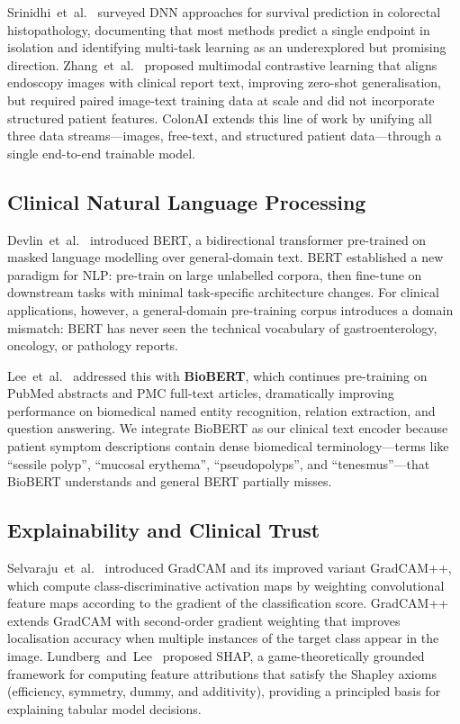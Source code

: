 \documentclass[conference]{IEEEtran}
\begin{document}
Srinidhi~et~al.~\cite{srinidhi2021} surveyed DNN approaches for survival
prediction in colorectal histopathology, documenting that most methods predict
a single endpoint in isolation and identifying multi-task learning as an
underexplored but promising direction. Zhang~et~al.~\cite{zhang2022} proposed
multimodal contrastive learning that aligns endoscopy images with clinical
report text, improving zero-shot generalisation, but required paired image-text
training data at scale and did not incorporate structured patient features.
ColonAI extends this line of work by unifying all three data streams---images,
free-text, and structured patient data---through a single end-to-end trainable
model.

\subsection{Clinical Natural Language Processing}

Devlin~et~al.~\cite{devlin2019} introduced BERT, a bidirectional transformer
pre-trained on masked language modelling over general-domain text. BERT
established a new paradigm for NLP: pre-train on large unlabelled corpora,
then fine-tune on downstream tasks with minimal task-specific architecture
changes. For clinical applications, however, a general-domain pre-training
corpus introduces a domain mismatch: BERT has never seen the technical
vocabulary of gastroenterology, oncology, or pathology reports.

Lee~et~al.~\cite{lee2020biobert} addressed this with \textbf{BioBERT},
which continues pre-training on PubMed abstracts and PMC full-text articles,
dramatically improving performance on biomedical named entity recognition,
relation extraction, and question answering. We integrate BioBERT as our
clinical text encoder because patient symptom descriptions contain dense
biomedical terminology---terms like ``sessile polyp'', ``mucosal erythema'',
``pseudopolyps'', and ``tenesmus''---that BioBERT understands and general
BERT partially misses.

\subsection{Explainability and Clinical Trust}

Selvaraju~et~al.~\cite{selvaraju2020} introduced GradCAM and its improved
variant GradCAM++, which compute class-discriminative activation maps by
weighting convolutional feature maps according to the gradient of the
classification score. GradCAM++ extends GradCAM with second-order gradient
weighting that improves localisation accuracy when multiple instances of the
target class appear in the image. Lundberg~and~Lee~\cite{lundberg2017} proposed
SHAP, a game-theoretically grounded framework for computing feature attributions
that satisfy the Shapley axioms (efficiency, symmetry, dummy, and additivity),
providing a principled basis for explaining tabular model decisions.
\end{document}
